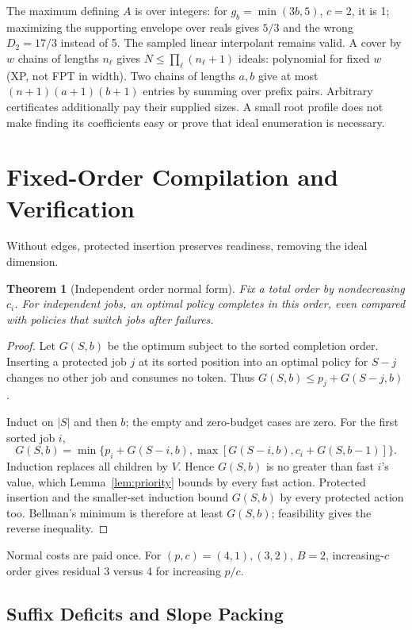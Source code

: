 \documentclass[acmsmall,screen,review,anonymous]{acmart}
\newtheorem{theorem}{Theorem}
\begin{document}
The maximum defining $A$ is over integers: for $g_b=\min(3b,5)$, $c=2$, it is 1; maximizing the supporting envelope over reals gives $5/3$ and the wrong $D_2=17/3$ instead of 5. The sampled linear interpolant remains valid. A cover by $w$ chains of lengths $n_\ell$ gives $N\le\prod_\ell(n_\ell+1)$ ideals: polynomial for fixed $w$ (XP, not FPT in width). Two chains of lengths $a,b$ give at most $(n+1)(a+1)(b+1)$ entries by summing over prefix pairs. Arbitrary certificates additionally pay their supplied sizes. A small root profile does not make finding its coefficients easy or prove that ideal enumeration is necessary.

\section{Fixed-Order Compilation and Verification}
\label{sec:independent}

Without edges, protected insertion preserves readiness, removing the ideal dimension.

\begin{theorem}[Independent order normal form]
\label{thm:order}
Fix a total order by nondecreasing $c_i$. For independent jobs, an optimal policy completes in this order, even compared with policies that switch jobs after failures.
\end{theorem}
\begin{proof}
Let $G(S,b)$ be the optimum subject to the sorted completion order. Inserting a protected job $j$ at its sorted position into an optimal policy for $S-j$ changes no other job and consumes no token. Thus $G(S,b)\le p_j+G(S-j,b)$.

Induct on $|S|$ and then $b$; the empty and zero-budget cases are zero. For the first sorted job $i$,
\[
 G(S,b)=\min\{p_i+G(S-i,b),\max[G(S-i,b),c_i+G(S,b-1)]\}.
\]
Induction replaces all children by $V$. Hence $G(S,b)$ is no greater than fast $i$'s value, which Lemma~\ref{lem:priority} bounds by every fast action. Protected insertion and the smaller-set induction bound $G(S,b)$ by every protected action too. Bellman's minimum is therefore at least $G(S,b)$; feasibility gives the reverse inequality.
\end{proof}

Normal costs are paid once. For $(p,c)=(4,1),(3,2)$, $B=2$, increasing-$c$ order gives residual 3 versus 4 for increasing $p/c$.

\subsection{Suffix Deficits and Slope Packing}
\label{sec:compiler}
\end{document}
